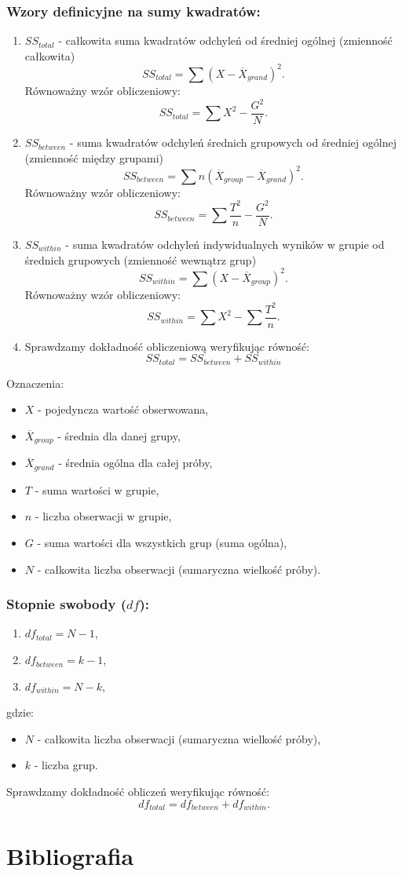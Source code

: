 \documentclass{article}
\begin{document}
\subsubsection{Wzory definicyjne na sumy kwadratów:}
\begin{enumerate}
    \item $SS_{total}$ - całkowita suma kwadratów odchyleń od średniej ogólnej (zmienność całkowita)
    $$SS_{total}=\sum(X-\overline{X}_{grand})^2.$$
    Równoważny wzór obliczeniowy:
    $$SS_{total}=\sum X^2-\frac{G^2}{N}.$$
    \item $SS_{between}$ - suma kwadratów odchyleń średnich grupowych od średniej ogólnej (zmienność między grupami)
    $$SS_{between}=\sum n(\overline{X}_{group}-\overline{X}_{grand})^2.$$
    Równoważny wzór obliczeniowy:
    $$SS_{between}=\sum \frac{T^2}{n}-\frac{G^2}{N}.$$
    \item $SS_{within}$ - suma kwadratów odchyleń indywidualnych wyników w grupie od średnich grupowych (zmienność wewnątrz grup)
    $$SS_{within}=\sum(X-\overline{X}_{group})^2.$$
    Równoważny wzór obliczeniowy:
    $$SS_{within}=\sum X^2-\sum\frac{T^2}{n}.$$
    \item Sprawdzamy dokładność obliczeniową weryfikując równość:
    $$SS_{total}=SS_{between}+SS_{within}$$
\end{enumerate}
Oznaczenia:
\begin{itemize}
    \item $X$ - pojedyncza wartość obserwowana,
    \item $\overline{X}_{group}$ - średnia dla danej grupy,
    \item $\overline{X}_{grand}$ - średnia ogólna dla całej próby,
    \item $T$ - suma wartości w grupie,
    \item $n$ - liczba obserwacji w grupie,
    \item $G$ - suma wartości dla wszystkich grup (suma ogólna),
    \item $N$ - całkowita liczba obserwacji (sumaryczna wielkość próby). \cite{witte2010statistics}
\end{itemize}

\newpage
\subsubsection{Stopnie swobody ($df$):}
\begin{enumerate}
    \item $df_{total}=N-1$,
    \item $df_{between}=k-1$,
    \item $df_{within}=N-k$,
\end{enumerate}
gdzie:
\begin{itemize}
    \item $N$ - całkowita liczba obserwacji (sumaryczna wielkość próby),
    \item $k$ - liczba grup.
\end{itemize}
\vspace{2mm}
Sprawdzamy dokładność obliczeń weryfikując równość:
$$df_{total}=df_{between}+df_{within}.$$


\newpage
\section{Bibliografia}


\end{document}
